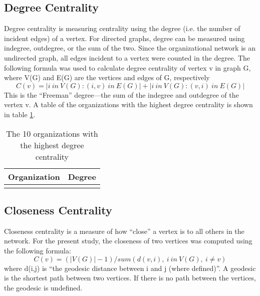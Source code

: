 \subsection{Degree Centrality}
Degree centrality is measuring centrality using the degree (i.e. the number of incident edges) of a vertex. For directed graphs, degree can be measured using indegree, outdegree, or the sum of the two. Since the organizational network is an undirected graph, all edges incident to a vertex were counted in the degree. The following formula was used to calculate degree centrality of vertex v in graph G, where V(G) and E(G) are the vertices and edges of G, respectively %
\begin{equation*}
C(v) = | {i\:in\:V(G) : (i,v)\:in\:E(G)} |+|{i\:in\:V(G) : (v,i)\:in\:E(G)}|
\end{equation*}
This is the ``Freeman'' degree---the sum of the indegree and outdegree of the vertex v. A table of the organizations with the highest degree centrality is shown in table \ref{tab:degree}.

\begin{table}
	\begin{tabular}{l|c}%
		\bfseries Organization & \bfseries Degree%
		\csvreader[head to column names]{degree.csv}{}%
		{\\\hline\organizationa & \scorea}%
	\end{tabular}
	\centering
	\caption{The 10 organizations with the highest degree centrality}\label{tab:degree}
\end{table}
\subsection{Closeness Centrality}
Closeness centrality is a measure of how ``close'' a vertex is to all others in the network. For the present study, the closeness of two vertices was computed using the following formula:
\begin{equation*}
	C(v) = (|V(G)|-1)/sum( d(v,i),\:i\:in\:V(G),\:i \neq v )
\end{equation*}
where d(i,j) is ``the geodesic distance between i and j (where defined)''\cite{butts}. A geodesic is the shortest path between two vertices. If there is no path between the vertices, the geodesic is undefined. 


